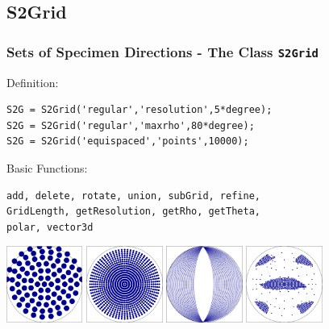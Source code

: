 \subsection*{S2Grid}


\begin{frame}[fragile]
  \frametitle{Sets of Specimen Directions - The \MTEX Class \texttt{\bf S2Grid}}

Definition:

\begin{lstlisting}
S2G = S2Grid('regular','resolution',5*degree);
S2G = S2Grid('regular','maxrho',80*degree);
S2G = S2Grid('equispaced','points',10000);
\end{lstlisting}

\medskip

Basic Functions:

\begin{lstlisting}
add, delete, rotate, union, subGrid, refine,
GridLength, getResolution, getRho, getTheta,
polar, vector3d
\end{lstlisting}

\begin{center}
  \includegraphics[width=2.5cm]{pic/S2Grid1} \quad
  \includegraphics[width=2.5cm]{pic/S2Grid2} \quad
  \includegraphics[width=2.5cm]{pic/S2Grid3} \quad
  \includegraphics[width=2.5cm]{pic/S2Grid4}
\end{center}

\end{frame}

